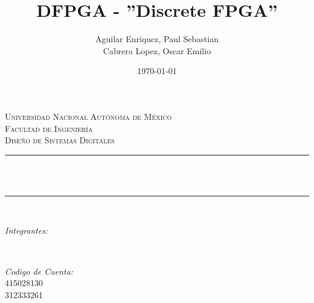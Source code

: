 \documentclass[12pt]{article}
\title{DFPGA - ''Discrete FPGA''} %
\author{Aguilar Enriquez, Paul Sebastian \\ Cabrera Lopez, Oscar Emilio}  %
\date{\today} %
\makeatletter
\let\thetitle\@title
\let\theauthor\@author
\makeatother
\begin{document}
\begin{titlepage}
    \centering
    
    \par
    \hfill
    \par
    
    \hfill \break
    
    \textsc{\LARGE Universidad Nacional Autónoma de México}\\[2.0 cm]   %
    \textsc{\Large Facultad de Ingeniería}\\[0.5 cm]                    %
    \textsc{\large Diseño de Sistemas Digitales}\\[0.5 cm]              %
    \rule{\linewidth}{0.2 mm} \\[0.4 cm]
    { \huge \bfseries \thetitle}\\
    \rule{\linewidth}{0.2 mm} \\[1.5 cm]
    
    \begin{minipage}{0.4\textwidth}
        \begin{flushleft} \large
            \emph{Integrantes:}\\
            \theauthor
        \end{flushleft}
    \end{minipage}~
    \begin{minipage}{0.4\textwidth}
        \begin{flushright} \large
            \emph{Codigo de Cuenta:} \\
            415028130\\312333261                                   %
        \end{flushright}
    \end{minipage}\\[2 cm]
    

\end{titlepage}
\end{document}
